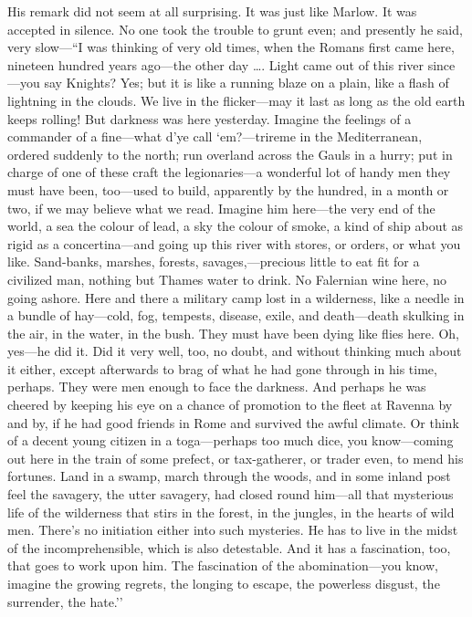 \documentclass[12pt]{report}
\begin{document}
His remark did not seem at all surprising. It was just like Marlow. It
was accepted in silence. No one took the trouble to grunt even; and
presently he said, very slow---``I was thinking of very old times, when
the Romans first came here, nineteen hundred years ago---the other day
\ldots{}. Light came out of this river since---you say Knights? Yes; but
it is like a running blaze on a plain, like a flash of lightning in the
clouds. We live in the flicker---may it last as long as the old earth
keeps rolling! But darkness was here yesterday. Imagine the feelings of
a commander of a fine---what d'ye call `em?---trireme in the
Mediterranean, ordered suddenly to the north; run overland across the
Gauls in a hurry; put in charge of one of these craft the
legionaries---a wonderful lot of handy men they must have been,
too---used to build, apparently by the hundred, in a month or two, if we
may believe what we read. Imagine him here---the very end of the world,
a sea the colour of lead, a sky the colour of smoke, a kind of ship
about as rigid as a concertina---and going up this river with stores, or
orders, or what you like. Sand-banks, marshes, forests,
savages,---precious little to eat fit for a civilized man, nothing but
Thames water to drink. No Falernian wine here, no going ashore. Here and
there a military camp lost in a wilderness, like a needle in a bundle of
hay---cold, fog, tempests, disease, exile, and death---death skulking in
the air, in the water, in the bush. They must have been dying like flies
here. Oh, yes---he did it. Did it very well, too, no doubt, and without
thinking much about it either, except afterwards to brag of what he had
gone through in his time, perhaps. They were men enough to face the
darkness. And perhaps he was cheered by keeping his eye on a chance of
promotion to the fleet at Ravenna by and by, if he had good friends in
Rome and survived the awful climate. Or think of a decent young citizen
in a toga---perhaps too much dice, you know---coming out here in the
train of some prefect, or tax-gatherer, or trader even, to mend his
fortunes. Land in a swamp, march through the woods, and in some inland
post feel the savagery, the utter savagery, had closed round him---all
that mysterious life of the wilderness that stirs in the forest, in the
jungles, in the hearts of wild men. There's no initiation either into
such mysteries. He has to live in the midst of the incomprehensible,
which is also detestable. And it has a fascination, too, that goes to
work upon him. The fascination of the abomination---you know, imagine
the growing regrets, the longing to escape, the powerless disgust, the
surrender, the hate.''
\end{document}
